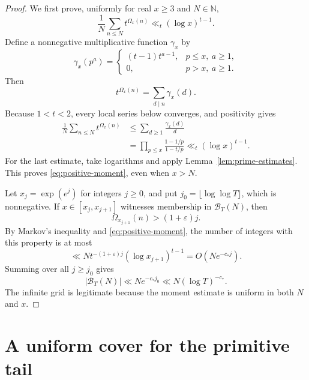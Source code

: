 \documentclass[11pt]{article}
\theoremstyle{definition}
\theoremstyle{remark}
\numberwithin{equation}{section}
\newcommand{\N}{\mathbb N}
\newcommand{\eps}{\varepsilon}
\begin{document}
\begin{proof}
We first prove, uniformly for real \(x\ge3\) and \(N\in\N\),
\begin{equation}\label{eq:positive-moment}
 \frac1N\sum_{n\le N}t^{\Omega_x(n)}
 \ll_t(\log x)^{t-1}.
\end{equation}
Define a nonnegative multiplicative function \(\gamma_x\) by
\[
 \gamma_x(p^a)=
 \begin{cases}
  (t-1)t^{a-1},&p\le x,\ a\ge1,\\
  0,&p>x,\ a\ge1.
 \end{cases}
\]
Then
\[
 t^{\Omega_x(n)}=\sum_{d\mid n}\gamma_x(d).
\]
Because \(1<t<2\), every local series below converges, and
positivity gives
\begin{align*}
 \frac1N\sum_{n\le N}t^{\Omega_x(n)}
 &\le\sum_{d\ge1}\frac{\gamma_x(d)}d\\
 &=\prod_{p\le x}\frac{1-1/p}{1-t/p}
 \ll_t(\log x)^{t-1}.
\end{align*}
For the last estimate, take logarithms and apply
Lemma~\ref{lem:prime-estimates}. This proves
\eqref{eq:positive-moment}, even when \(x>N\).

Let \(x_j=\exp(e^j)\) for integers \(j\ge0\), and put
\(j_0=\lfloor\log\log T\rfloor\), which is nonnegative.
If \(x\in[x_j,x_{j+1}]\) witnesses membership in
\(\mathcal B_T(N)\), then
\[
 \Omega_{x_{j+1}}(n)>(1+\eps)j.
\]
By Markov's inequality and \eqref{eq:positive-moment}, the number
of integers with this property is at most
\[
 \ll N t^{-(1+\eps)j}
          (\log x_{j+1})^{t-1}
 =O\left(N e^{-c_*j}\right).
\]
Summing over all \(j\ge j_0\) gives
\[
 |\mathcal B_T(N)|
 \ll N e^{-c_*j_0}
 \ll N(\log T)^{-c_*}.
\]
The infinite grid is legitimate because the moment estimate is
uniform in both \(N\) and \(x\).
\end{proof}

\section{A uniform cover for the primitive tail}
\end{document}
